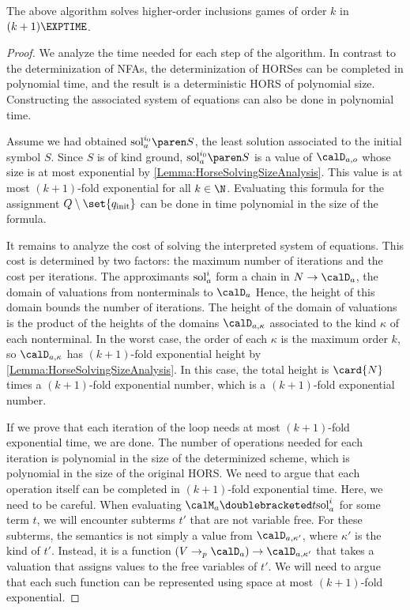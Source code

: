 \documentclass[../../diss.tex]{subfiles}
\begin{document}
\begin{proposition}%
\label{Proposition:HorseSolvingMembership}%
    The above algorithm solves higher-order inclusions games of order $k$ in $(k+1)\EXPTIME$.
\end{proposition}

\begin{proof}
    We analyze the time needed for each step of the algorithm.
    In contrast to the determinization of NFAs, the determinization of HORSes can be completed in polynomial time, and the result is a deterministic HORS of polynomial size.
    Constructing the associated system of equations can also be done in polynomial time.

    Assume we had obtained $\sola{i_0}{S}$, the least solution associated to the initial symbol $S$.
    Since $S$ is of kind ground, $\sola{i_0}{S}$ is a value of $\domaina{\ground}$ whose size is at most exponential by \cref{Lemma:HorseSolvingSizeAnalysis}.
    This value is at most $(k+1)$-fold exponential for all $k \in \N$.
    Evaluating this formula for the assignment $Q \setminus \set{\qinit}$ can be done in time polynomial in the size of the formula.

    It remains to analyze the cost of solving the interpreted system of equations.
    This cost is determined by two factors: the maximum number of iterations and the cost per iterations.
    The approximants $\text{sol}_{a}^{i}$ form a chain in $N \to \domaina$, the domain of valuations from nonterminals to $\domaina$
    Hence, the height of this domain bounds the number of iterations.
    The height of the domain of valuations is the product of the heights of the domains $\domaina{\kappa}$ associated to the kind $\kappa$ of each nonterminal.
    In the worst case, the order of each $\kappa$ is the maximum order $k$, so $\domaina{\kappa}$ has $(k+1)$-fold exponential height by \cref{Lemma:HorseSolvingSizeAnalysis}.
    In this case, the total height is $\card{N}$ times a $(k+1)$-fold exponential number, which is a $(k+1)$-fold exponential number.

    If we prove that each iteration of the loop needs at most $(k+1)$-fold exponential time, we are done.
    The number of operations needed for each iteration is polynomial in the size of the determinized scheme, which is polynomial in the size of the original HORS.\@
    We need to argue that each operation itself can be completed in $(k+1)$-fold exponential time.
    Here, we need to be careful.
    When evaluating \eg $\sema{t}{\solai{i}}$ for some term $t$, we will encounter subterms $t'$ that are not variable free.
    For these subterms, the semantics is not simply a value from $\domaina{\kappa'}$, where $\kappa'$ is the kind of $t'$.
    Instead, it is a function $(V \pto \domaina) \to \domaina{\kappa'}$ that takes a valuation that assigns values to the free variables of $t'$.
    We will need to argue that each such function can be represented using space at most $(k+1)$-fold exponential.


\end{proof}
\end{document}
